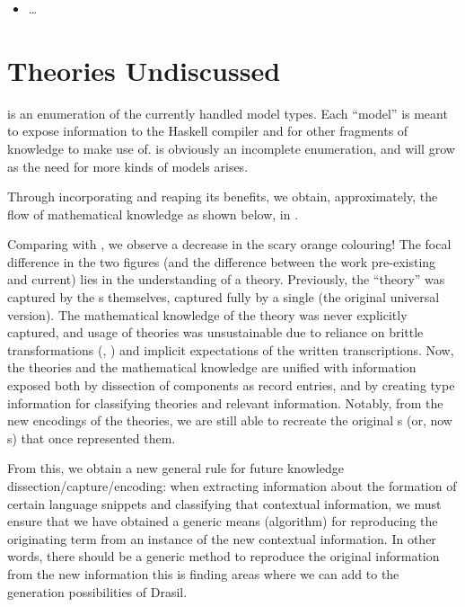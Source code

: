 \begin{itemize}

	\item \OthModel{} \ldots{}

\end{itemize}

\section{Theories Undiscussed}

\ModelKinds{} is an enumeration of the currently handled model types. Each
``model'' is meant to expose information to the Haskell compiler and for other
fragments of knowledge to make use of. \ModelKinds{} is obviously an incomplete
enumeration, and will grow as the need for more kinds of models arises.

Through incorporating \ModelKinds{} and reaping its benefits, we obtain,
approximately, the flow of mathematical knowledge as shown below, in
.

\theoriesWithModelKinds{}

Comparing  with , we
observe a decrease in the scary orange colouring! The focal difference in the
two figures (and the difference between the work pre-existing and current) lies
in the understanding of a theory. Previously, the ``theory'' was captured by the
\RelationConcept{}s themselves, captured fully by a single \Expr{} (the original
universal version). The mathematical knowledge of the theory was never
explicitly captured, and usage of theories was unsustainable due to reliance on
brittle transformations (\relToQD{}, ) and implicit
expectations of the written transcriptions. Now, the theories and the
mathematical knowledge are unified with information exposed both by dissection
of components as record entries, and by creating type information for
classifying theories and relevant information. Notably, from the new encodings
of the theories, we are still able to recreate the original \Expr{}s (or, now
\ModelExpr{}s) that once represented them.



From this, we obtain a new general rule for future knowledge
dissection/capture/encoding: when extracting information about the formation of
certain language snippets and classifying that contextual information, we must
ensure that we have obtained a generic means (algorithm) for reproducing the
originating term from an instance of the new contextual information. In other
words, there should be a generic method to reproduce the original information
from the new information \textemdash{} this is finding areas where we can add to the
generation possibilities of Drasil.

